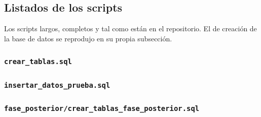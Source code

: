 \subsection*{Listados de los scripts}

Los scripts largos, completos y tal como están en el repositorio. El de creación de la base de datos se reprodujo en su propia subsección.

\subsubsection*{\texttt{crear\_tablas.sql}}


\subsubsection*{\texttt{insertar\_datos\_prueba.sql}}


\subsubsection*{\texttt{fase\_posterior/crear\_tablas\_fase\_posterior.sql}}

